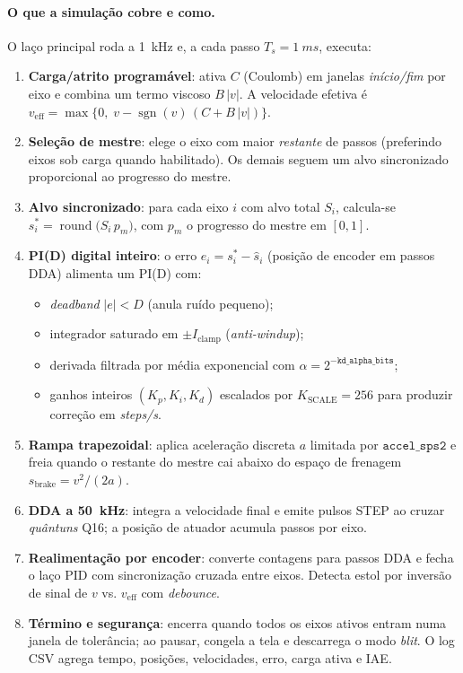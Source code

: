 \paragraph{O que a simulação cobre e como.}
O la\c{c}o principal roda a \SI{1}{kHz} e, a cada passo $T_s=\SI{1}{ms}$, executa:
\begin{enumerate}
  \item \textbf{Carga/atrito programável}: ativa $C$ (Coulomb) em janelas \emph{início/fim} por eixo e combina um termo viscoso $B\,|v|$. A velocidade efetiva é
        $v_\text{eff}=\max\{0,\;v-\operatorname{sgn}(v)\,(C+B\,|v|)\}$.
  \item \textbf{Seleção de mestre}: elege o eixo com maior \emph{restante} de passos (preferindo eixos sob carga quando habilitado). Os demais seguem um alvo sincronizado proporcional ao progresso do mestre.
  \item \textbf{Alvo sincronizado}: para cada eixo $i$ com alvo total $S_i$, calcula-se $s_i^* = \operatorname{round}\!\big(S_i\,p_m\big)$, com $p_m$ o progresso do mestre em $[0,1]$.
  \item \textbf{PI(D) digital inteiro}: o erro $e_i=s_i^*-\hat{s}_i$ (posição de encoder em passos DDA) alimenta um PI(D) com:
        \begin{itemize}
          \item \emph{deadband} $|e|<D$ (anula ruído pequeno);
          \item integrador saturado em $\pm I_\text{clamp}$ (\emph{anti-windup});
          \item derivada filtrada por média exponencial com $\alpha=2^{-\texttt{kd\_alpha\_bits}}$;
          \item ganhos inteiros $(K_p,K_i,K_d)$ escalados por $K_\text{SCALE}=256$ para produzir correção em \emph{steps/s}.
        \end{itemize}
  \item \textbf{Rampa trapezoidal}: aplica aceleração discreta $a$ limitada por $\texttt{accel\_sps2}$ e freia quando o restante do mestre cai abaixo do espaço de frenagem $s_\text{brake}=v^2/(2a)$.
  \item \textbf{DDA a \SI{50}{kHz}}: integra a velocidade final e emite pulsos STEP ao cruzar \emph{quântuns} Q16; a posição de atuador acumula passos por eixo.
  \item \textbf{Realimentação por encoder}: converte contagens para passos DDA e fecha o laço PID com sincronização cruzada entre eixos. Detecta estol por inversão de sinal de $v$ vs. $v_\text{eff}$ com \emph{debounce}.
  \item \textbf{Término e segurança}: encerra quando todos os eixos ativos entram numa janela de tolerância; ao pausar, congela a tela e descarrega o modo \emph{blit}. O log CSV agrega tempo, posições, velocidades, erro, carga ativa e IAE.
\end{enumerate}

